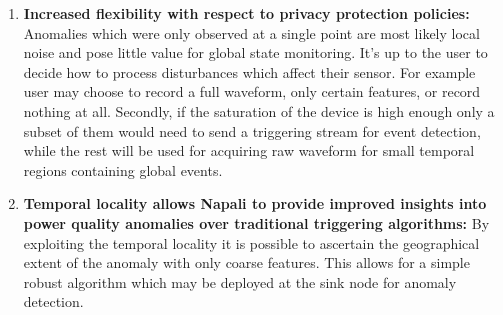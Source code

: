 \begin{enumerate}
    \item \textbf{Increased flexibility with respect to privacy protection policies:} Anomalies which were only observed at a single point are most likely local noise and pose little value for global state monitoring.
    It's up to the user to decide how to process disturbances which affect their sensor.
    For example user may choose to record a full waveform, only certain features, or record nothing at all.
    Secondly, if the saturation of the device is high enough only a subset of them would need to send a triggering stream for event detection, while the rest will be used for acquiring raw waveform for small temporal regions containing global events.

    \item \textbf{Temporal locality allows Napali to provide improved insights into power quality anomalies over traditional triggering algorithms:} By exploiting the temporal locality it is possible to ascertain the geographical extent of the anomaly with only coarse features.
    This allows for a simple robust algorithm which may be deployed at the sink node for anomaly detection.
\end{enumerate}

